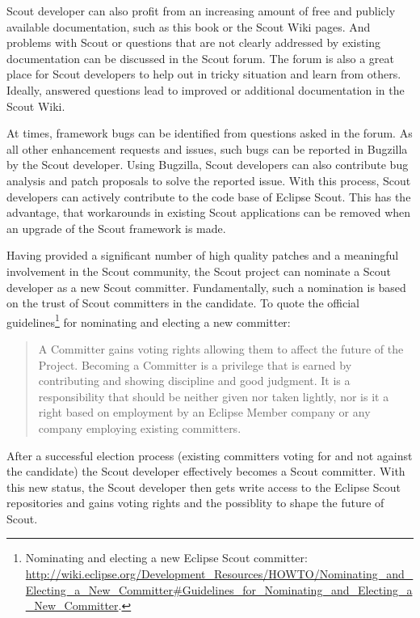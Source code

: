 \documentclass[a4paper,10pt,twoside]{book}
\begin{document}
Scout developer can also profit from an increasing amount of free and publicly available documentation, such as this book or the Scout Wiki pages. 
And problems with Scout or questions that are not clearly addressed by existing documentation can be discussed in the Scout forum. 
The forum is also a great place for Scout developers to help out in tricky situation and learn from others. 
Ideally, answered questions lead to improved or additional documentation in the Scout Wiki.

At times, framework bugs can be identified from questions asked in the forum. 
As all other enhancement requests and issues, such bugs can be reported in Bugzilla by the Scout developer. 
Using Bugzilla, Scout developers can also contribute bug analysis and patch proposals to solve the reported issue.
With this process, Scout developers can actively contribute to the code base of Eclipse Scout.
This has the advantage, that workarounds in existing Scout applications can be removed when an upgrade of the Scout framework is made.

Having provided a significant number of high quality patches and a meaningful involvement in the Scout community, the Scout project can nominate a Scout developer as a new Scout committer. 
Fundamentally, such a nomination is based on the trust of Scout committers in the candidate. 
To quote the official guidelines\footnote{
Nominating and electing a new Eclipse Scout committer: \url{http://wiki.eclipse.org/Development_Resources/HOWTO/Nominating_and_Electing_a_New_Committer#Guidelines_for_Nominating_and_Electing_a_New_Committer}.
} 
for nominating and electing a new committer:

\begin{quotation}
\begin{em}
A Committer gains voting rights allowing them to affect the future of the Project. 
Becoming a Committer is a privilege that is earned by contributing and showing discipline and good judgment. 
It is a responsibility that should be neither given nor taken lightly, nor is it a right based on employment by an Eclipse Member company or any company employing existing committers.
\end{em}
\end{quotation}

\noindent After a successful election process (existing committers voting for and not against the candidate) the Scout developer effectively becomes a Scout committer. 
With this new status, the Scout developer then gets write access to the Eclipse Scout repositories and gains voting rights and the possiblity to shape the future of Scout. 
\end{document}
